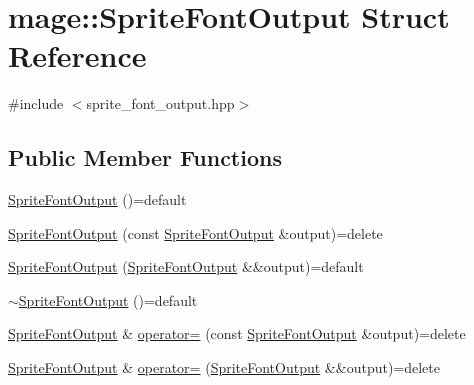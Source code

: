 \hypertarget{structmage_1_1_sprite_font_output}{}\section{mage\+:\+:Sprite\+Font\+Output Struct Reference}
\label{structmage_1_1_sprite_font_output}


{\ttfamily \#include $<$sprite\+\_\+font\+\_\+output.\+hpp$>$}

\subsection*{Public Member Functions}
\begin{DoxyCompactItemize}
\item 
\hyperlink{structmage_1_1_sprite_font_output_a91ed0cd4cb7f9bfab57ff0e3fa4436bc}{Sprite\+Font\+Output} ()=default
\item 
\hyperlink{structmage_1_1_sprite_font_output_a02ea4f9574bce22b4f0f32b78b6b3b79}{Sprite\+Font\+Output} (const \hyperlink{structmage_1_1_sprite_font_output}{Sprite\+Font\+Output} \&output)=delete
\item 
\hyperlink{structmage_1_1_sprite_font_output_ac7dbae468f4e14c2a41860c1ca4a05f6}{Sprite\+Font\+Output} (\hyperlink{structmage_1_1_sprite_font_output}{Sprite\+Font\+Output} \&\&output)=default
\item 
\hyperlink{structmage_1_1_sprite_font_output_ab0793582b679667ff018eda962b77f6a}{$\sim$\+Sprite\+Font\+Output} ()=default
\item 
\hyperlink{structmage_1_1_sprite_font_output}{Sprite\+Font\+Output} \& \hyperlink{structmage_1_1_sprite_font_output_a1eeb719ec5e2e8f84f51fc9c5db228f7}{operator=} (const \hyperlink{structmage_1_1_sprite_font_output}{Sprite\+Font\+Output} \&output)=delete
\item 
\hyperlink{structmage_1_1_sprite_font_output}{Sprite\+Font\+Output} \& \hyperlink{structmage_1_1_sprite_font_output_a5433b918576d7e6724ed46046724a753}{operator=} (\hyperlink{structmage_1_1_sprite_font_output}{Sprite\+Font\+Output} \&\&output)=delete
\end{DoxyCompactItemize}
